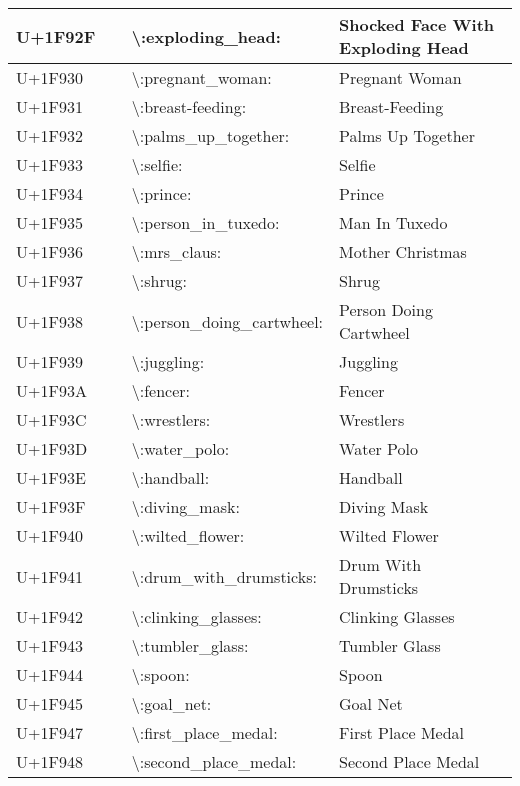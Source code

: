 \begin{table}[h]
\begin{tabulary}{\linewidth}{|L|L|L|L|}
\hline
U+1F92F & 🤯 & {\textbackslash}:exploding\_head: & Shocked Face With Exploding Head \\
\hline
U+1F930 & 🤰 & {\textbackslash}:pregnant\_woman: & Pregnant Woman \\
\hline
U+1F931 & 🤱 & {\textbackslash}:breast-feeding: & Breast-Feeding \\
\hline
U+1F932 & 🤲 & {\textbackslash}:palms\_up\_together: & Palms Up Together \\
\hline
U+1F933 & 🤳 & {\textbackslash}:selfie: & Selfie \\
\hline
U+1F934 & 🤴 & {\textbackslash}:prince: & Prince \\
\hline
U+1F935 & 🤵 & {\textbackslash}:person\_in\_tuxedo: & Man In Tuxedo \\
\hline
U+1F936 & 🤶 & {\textbackslash}:mrs\_claus: & Mother Christmas \\
\hline
U+1F937 & 🤷 & {\textbackslash}:shrug: & Shrug \\
\hline
U+1F938 & 🤸 & {\textbackslash}:person\_doing\_cartwheel: & Person Doing Cartwheel \\
\hline
U+1F939 & 🤹 & {\textbackslash}:juggling: & Juggling \\
\hline
U+1F93A & 🤺 & {\textbackslash}:fencer: & Fencer \\
\hline
U+1F93C & 🤼 & {\textbackslash}:wrestlers: & Wrestlers \\
\hline
U+1F93D & 🤽 & {\textbackslash}:water\_polo: & Water Polo \\
\hline
U+1F93E & 🤾 & {\textbackslash}:handball: & Handball \\
\hline
U+1F93F & 🤿 & {\textbackslash}:diving\_mask: & Diving Mask \\
\hline
U+1F940 & 🥀 & {\textbackslash}:wilted\_flower: & Wilted Flower \\
\hline
U+1F941 & 🥁 & {\textbackslash}:drum\_with\_drumsticks: & Drum With Drumsticks \\
\hline
U+1F942 & 🥂 & {\textbackslash}:clinking\_glasses: & Clinking Glasses \\
\hline
U+1F943 & 🥃 & {\textbackslash}:tumbler\_glass: & Tumbler Glass \\
\hline
U+1F944 & 🥄 & {\textbackslash}:spoon: & Spoon \\
\hline
U+1F945 & 🥅 & {\textbackslash}:goal\_net: & Goal Net \\
\hline
U+1F947 & 🥇 & {\textbackslash}:first\_place\_medal: & First Place Medal \\
\hline
U+1F948 & 🥈 & {\textbackslash}:second\_place\_medal: & Second Place Medal \\

\end{tabulary}
\end{table}
